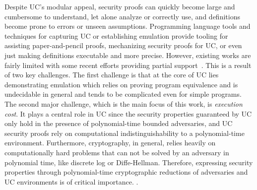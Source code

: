 Despite UC's modular appeal, security proofs can quickly become large and cumbersome to understand, let alone analyze or correctly use, and definitions become prone to errors or unseen assumptions.
Programming language tools and techniques for capturing UC or establishing emulation provide tooling for assisting paper-and-pencil proofs, mechanizing security proofs for UC, or even just making definitions executable and more precise.
However, existing works are fairly limited with some recent efforts providing
partial support~\cite{ilc,easyuc,ipdl,symbolicuc,barbosa}. This is a result of two key challenges.
The first challenge is that at the core of UC lies demonstrating emulation which relies on proving program equivalence and is undecidable in general
and tends to be complicated even for simple programs.
The second major challenge, which is the main focus of this work, is \emph{execution cost}. It plays a central role in UC since the security properties
guaranteed by UC only hold in the presence of polynomial-time bounded adversaries, and UC security proofs rely on computational indistinguishability to a polynomial-time environment. 
Furthermore, cryptography, in general, relies heavily on computationally hard problems that can not be solved by an adversary in polynomial time, like discrete log or Diffe-Hellman. 
Therefore, expressing security properties 
through polynomial-time cryptographic reductions of adversaries and UC environments is of critical importance.
.
